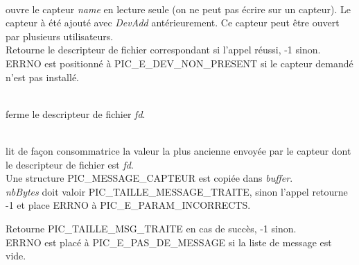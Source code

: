 \begin{m_desc}
\item [open(char* name, int mode, int flag)]\hfill\\
ouvre le capteur \textsl{name} en lecture seule (on ne peut pas écrire
sur un capteur).
Le capteur à été ajouté avec \textsl{DevAdd} antérieurement.
 Ce capteur peut être ouvert par plusieurs utilisateurs.\\
Retourne le descripteur de fichier correspondant si l'appel réussi, -1 sinon.\\
ERRNO est positionné à PIC\_E\_DEV\_NON\_PRESENT si le capteur demandé 
n'est pas installé.

\item [close(int fd)]\hfill\\
ferme le descripteur de fichier \textsl{fd}.

\item [read(int fd, char* buffer, int nbBytes)]\hfill\\
lit de façon consommatrice la valeur la plus ancienne envoyée par le 
capteur dont le descripteur de fichier est  \textsl{fd}.\\
Une structure PIC\_MESSAGE\_CAPTEUR est copiée dans \textsl{buffer}.\\
\textsl{nbBytes} doit valoir PIC\_TAILLE\_MESSAGE\_TRAITE, sinon l'appel
retourne -1 et place ERRNO à PIC\_E\_PARAM\_INCORRECTS. 

Retourne PIC\_TAILLE\_MSG\_TRAITE en cas de succès, -1 sinon.\\
ERRNO est placé à PIC\_E\_PAS\_DE\_MESSAGE si la liste de message
est vide.

\end{m_desc}

\vfill
\pagebreak

